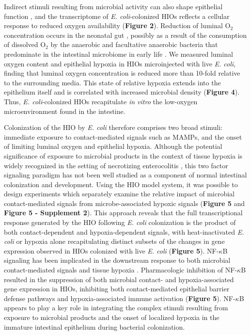 \documentclass[9pt,lineo]{elife}
\begin{document}
Indirect stimuli resulting from microbial activity can also shape epithelial function \citep{Buffie:2013}, and the transcriptome of \emph{E. coli}-colonized HIOs reflects a cellular response to reduced oxygen availability (\textbf{Figure 2}). Reduction of luminal O\(_{\text{2}}\) concentration occurs in the neonatal gut \citep{Gruette:1965,Fisher:2013,Zheng:2015}, possibly as a result of the consumption of dissolved O\(_{\text{2}}\) by the anaerobic and facultative anaerobic bacteria that predominate in the intestinal microbiome in early life \citep{Espey:2013,Fanaro:2003,Favier:2002,Palmer:2007}. We measured luminal oxygen content and epithelial hypoxia in HIOs microinjected with live \emph{E. coli}, finding that luminal oxygen concentration is reduced more than 10-fold relative to the surrounding media. This state of relative hypoxia extends into the epithelium itself and is correlated with increased microbial density (\textbf{Figure 4}). Thus, \emph{E. coli}-colonized HIOs recapitulate \emph{in vitro} the low-oxygen microenvironment found in the intestine.

Colonization of the HIO by \emph{E. coli} therefore comprises two broad stimuli: immediate exposure to contact-mediated signals such as MAMPs, and the onset of limiting luminal oxygen and epithelial hypoxia. Although the potential significance of exposure to microbial products in the context of tissue hypoxia is widely recognized in the setting of necrotizing enterocolitis \citep{Tanner:2015,Afrazi:2014,Hackam:2013,Neu:2011,Upperman:2005,Nanthakumar:2011}, this two factor signaling paradigm has not been well studied as a component of normal intestinal colonization and development. Using the HIO model system, it was possible to design experiments which separately examine the relative impact of microbial contact-mediated signals from microbe-associated hypoxic signals (\textbf{Figure 5} and \textbf{Figure 5 - Supplement 2}). This approach reveals that the full transcriptional response generated by the HIO following \emph{E. coli} colonization is the product of both contact-dependent and hypoxia-dependent signals, with heat-inactivated \emph{E. coli} or hypoxia alone recapitulating distinct subsets of the changes in gene expression observed in HIOs colonized with live \emph{E. coli} (\textbf{Figure 5}). NF-\(\kappa\)B signaling has been implicated in the downstream response to both microbial contact-mediated signals \citep{Zhang:2001,Xiao:2005,Kawai:2007} and tissue hypoxia \citep{Rius:2008,Arias-Loste:2015,Oliver:2009,Zeitouni:2016,Colgan:2013,Grenz:2012}. Pharmacologic inhibition of NF-\(\kappa\)B resulted in the suppression of both microbial contact- and hypoxia-associated gene expression in HIOs, inhibiting both contact-mediated epithelial barrier defense pathways and hypoxia-associated immune activation (\textbf{Figure 5}). NF-\(\kappa\)B appears to play a key role in integrating the complex stimuli resulting from exposure to microbial products and the onset of localized hypoxia in the immature intestinal epithelium during bacterial colonization.
\end{document}
